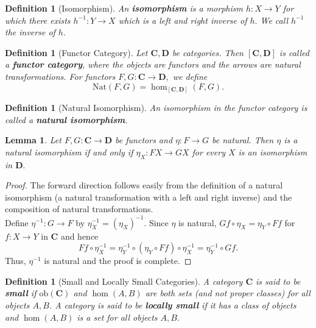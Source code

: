 \documentclass{article}
\newtheorem{lemma}[proposition]{Lemma}
\newtheorem{definition}[proposition]{Definition}
\numberwithin{equation}{section}
\newcommand{\cat}[1]{{\mathbf{#1}}}
\newcommand{\ob}{\mathrm{ob}}
\newcommand{\Nat}{\mathrm{Nat}}
\begin{document}
\begin{definition}[Isomorphism]
An \textbf{isomorphism} is a morphism $h : X \to Y$ for which there exists $h^{-1} : Y \to X$ which is a left and right inverse of $h.$ We call $h^{-1}$ the inverse of $h.$
\end{definition}

\begin{definition}[Functor Category]
Let $\cat{C}, \cat{D}$ be categories. Then $[\cat{C}, \cat{D}]$ is called a \textbf{functor category}, where the objects are functors and the arrows are natural transformations. For functors $F, G : \cat{C} \to \cat{D},$ we define $$\Nat(F, G) = \hom_{[\cat{C}, \cat{D}]}(F, G).$$
\end{definition}

\begin{definition}[Natural Isomorphism]
An isomorphism in the functor category is called a \textbf{natural isomorphism}.
\end{definition}

\begin{lemma} \label{lem:natural-isomorphism-alternate-definition}
Let $F, G : \cat{C} \to \cat{D}$ be functors and $\eta : F \to G$ be natural. Then $\eta$ is a natural isomorphism if and only if $\eta_X : FX \to GX$ for every $X$ is an isomorphism in $\cat{D}.$
\end{lemma}

\begin{proof}
The forward direction follows easily from the definition of a natural isomorphism (a natural transformation with a left and right inverse) and the composition of natural transformations. \\

Define $\eta^{-1} : G \to F$ by $\eta^{-1}_X = (\eta_X)^{-1}.$ Since $\eta$ is natural, $Gf \circ \eta_X = \eta_Y \circ Ff$ for $f : X \to Y$ in $\cat{C}$ and hence $$Ff \circ \eta^{-1}_X = \eta^{-1}_Y \circ (\eta_Y \circ Ff) \circ \eta^{-1}_X = \eta^{-1}_Y \circ Gf.$$ Thus, $\eta^{-1}$ is natural and the proof is complete.
\end{proof}

\begin{definition}[Small and Locally Small Categories]
A category $\cat{C}$ is said to be \textbf{small} if $\ob(\cat{C})$ and $\hom(A, B)$ are both sets (and not proper classes) for all objects $A, B$. A category is said to be \textbf{locally small} if it has a class of objects and $\hom(A, B)$ is a set for all objects $A, B.$ 
\end{definition}
\end{document}
